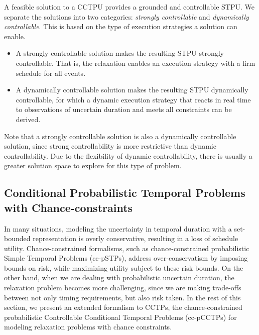 \documentclass[jair,twoside,11pt,theapa]{article}
\begin{document}
A feasible solution to a CCTPU provides a grounded and controllable STPU. We
separate the solutions into two categories: \textit{strongly controllable} and
\textit{dynamically controllable}. This is based on the type of execution
strategies a solution can enable.

\begin{itemize}
	
	\item A strongly controllable solution makes the resulting STPU strongly controllable. That is, the relaxation enables an execution strategy with a firm schedule for all events.  
	
	\item A dynamically controllable solution makes the resulting STPU dynamically
	controllable, for which a dynamic execution strategy that reacts in real time to observations of uncertain duration and meets all constraints can be derived. 
	
\end{itemize}

Note that a strongly controllable solution is also a dynamically controllable
solution, since strong controllability is more restrictive than dynamic
controllability. Due to the flexibility of dynamic controllability, there is usually a greater solution space to explore for this type of problem. 




\subsection{Conditional Probabilistic Temporal Problems with Chance-constraints}

In many situations, modeling the uncertainty in temporal duration with a
set-bounded representation is overly conservative, resulting in a loss of
schedule utility. Chance-constrained formalisms, such as chance-constrained
probabilistic Simple Temporal Problems (cc-pSTPs), address over-conservatism by
imposing bounds on risk, while maximizing utility subject to these risk bounds.
On the other hand, when we are dealing with probabilistic uncertain duration,
the relaxation problem becomes more challenging, since we are making trade-offs
between not only timing requirements, but also risk taken. In the rest of this
section, we present an extended formalism to CCTPs, the chance-constrained
probabilistic Controllable Conditional Temporal Problems (cc-pCCTPs) for modeling
relaxation problems with chance constraints. 
\end{document}
